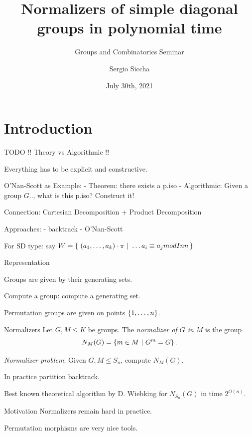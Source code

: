 \documentclass{beamer}
\title{Normalizers of simple diagonal groups in polynomial time}
\subtitle{Groups and Combinatorics Seminar}
\date{July 30th, 2021}
\author{Sergio Siccha}
\institute{TU Kaiserslautern}
\theoremstyle{plain}
\theoremstyle{definition}
\begin{document}
\maketitle
{}

\section{Introduction}
\begin{frame}{TODO}
!! Theory vs Algorithmic !!

Everything has to be explicit and constructive.

O'Nan-Scott as Example:
- Theorem: there exists a p.iso
- Algorithmic: Given a group $G .. $, what is this p.iso? Construct it!

Connection: Cartesian Decomposition + Product Decomposition

Approaches:
- backtrack
- O'Nan-Scott

For SD type: say
$W =  \left\{ \left.\, (a_1, \ldots, a_k) \cdot \pi  ~\right|~  \ldots a_i \equiv a_j mod Inn  \,\right\} $
\end{frame}

\begin{frame}{Representation}

Groups are given by their generating sets.

Compute a group: compute a generating set.

Permutation groups are given on points $ \left\{ 1, \ldots, n \right\} $.

\end{frame}

\begin{frame}{Normalizers}
Let $G, M \leq K$ be groups.
The \emph{normalizer of $G$ in $M$} is
the group
\[
N_M(G) =  \left\{  m \in M ~|~ G ^ m = G  \right\} .
\]

\pause
\emph{Normalizer problem}: Given $G, M \leq S_n$, compute $N_M(G)$.

\pause
In practice partition backtrack.

Best known theoretical algorithm by D. Wiebking for
$N_{S_n}(G)$ in
time $2 ^ {O(n)}$.
\end{frame}



\begin{frame}{Motivation}
Normalizers remain hard in practice.

Permutation morphisms are very nice tools.
\end{frame}
\end{document}

